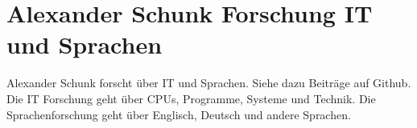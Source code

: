 \documentclass[10pt]{article}
\begin{document}
\section{Alexander Schunk Forschung IT und Sprachen}
Alexander Schunk forscht über IT und Sprachen. Siehe dazu Beiträge auf Github. Die IT Forschung geht über CPUs, Programme, Systeme und Technik. Die Sprachenforschung geht über Englisch, Deutsch und andere Sprachen.
\end{document}
